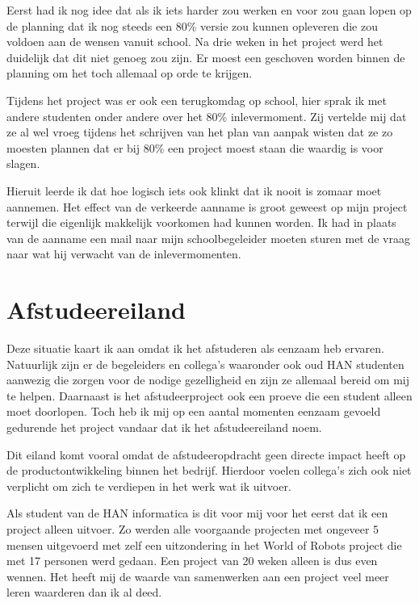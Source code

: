 \documentclass[a4paper, 11pt, oneside]{report}
\begin{document}
Eerst had ik nog idee dat als ik iets harder zou werken en voor zou gaan lopen op de planning dat ik nog steeds een 80\% versie zou kunnen opleveren die zou voldoen aan de wensen vanuit school. Na drie weken in het project werd het duidelijk dat dit niet genoeg zou zijn. Er moest een geschoven worden binnen de planning om het toch allemaal op orde te krijgen.

Tijdens het project was er ook een terugkomdag op school, hier sprak ik met andere studenten onder andere over het 80\% inlevermoment. Zij vertelde mij dat ze al wel vroeg tijdens het schrijven van het plan van aanpak wisten dat ze zo moesten plannen dat er bij 80\% een project moest staan die waardig is voor slagen.

Hieruit leerde ik dat hoe logisch iets ook klinkt dat ik nooit is zomaar moet aannemen. Het effect van de verkeerde aanname is groot geweest op mijn project terwijl die eigenlijk makkelijk voorkomen had kunnen worden. Ik had in plaats van de aanname een mail naar mijn schoolbegeleider moeten sturen met de vraag naar wat hij verwacht van de inlevermomenten.  
  


\section{Afstudeereiland}
Deze situatie kaart ik aan omdat ik het afstuderen als eenzaam heb ervaren.
Natuurlijk zijn er de begeleiders en collega's waaronder ook oud HAN studenten aanwezig die zorgen voor de nodige gezelligheid en zijn ze allemaal bereid om mij te helpen.
Daarnaast is het afstudeerproject ook een proeve die een student alleen moet doorlopen.
Toch heb ik mij op een aantal momenten eenzaam gevoeld gedurende het project vandaar dat ik het afstudeereiland noem.

Dit eiland komt vooral omdat de afstudeeropdracht geen directe impact heeft op de productontwikkeling binnen het bedrijf. Hierdoor voelen collega's zich ook niet verplicht om zich te verdiepen in het werk wat ik uitvoer. 

Als student van de HAN informatica is dit voor mij voor het eerst dat ik een project alleen uitvoer. 
Zo werden alle voorgaande projecten met ongeveer 5 mensen uitgevoerd met zelf een uitzondering in het World of Robots project die met 17 personen werd gedaan.
Een project van 20 weken alleen is dus even wennen.
Het heeft mij de waarde van samenwerken aan een project veel meer leren waarderen dan ik al deed. 
\end{document}
